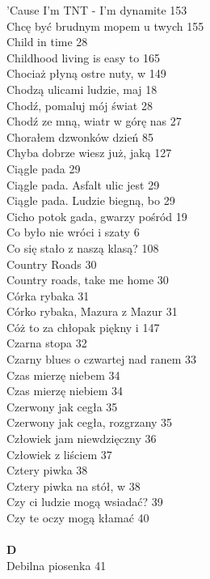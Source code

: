 \documentclass[a5paper, 10pt]{book}
\begin{document}
{\begin{multicols}{3}
    'Cause I'm TNT - I'm dynamite 153\\
    Chcę być brudnym mopem u twych 155\\
    Child in time 28\\
    Childhood living is easy to 165\\
    Chociaż płyną ostre nuty, w 149\\
    Chodzą ulicami ludzie, maj 18\\
    Chodź, pomaluj mój świat 28\\
    Chodź ze mną, wiatr w górę nas 27\\
    Chorałem dzwonków dzień 85\\
    Chyba dobrze wiesz już, jaką 127\\
    Ciągle pada 29\\
    Ciągle pada. Asfalt ulic jest 29\\
    Ciągle pada. Ludzie biegną, bo 29\\
    Cicho potok gada, gwarzy pośród 19\\
    Co było nie wróci i szaty 6\\
    Co się stało z naszą klasą? 108\\
    Country Roads 30\\
    Country roads, take me home 30\\
    Córka rybaka 31\\
    Córko rybaka, Mazura z Mazur 31\\
    Cóż to za chłopak piękny i 147\\
    Czarna stopa 32\\
    Czarny blues o czwartej nad ranem 33\\
    Czas mierzę niebem 34\\
    Czas mierzę niebiem 34\\
    Czerwony jak cegła 35\\
    Czerwony jak cegła, rozgrzany 35\\
    Człowiek jam niewdzięczny 36\\
    Człowiek z liściem 37\\
    Cztery piwka 38\\
    Cztery piwka na stół, w 38\\
    Czy ci ludzie mogą wsiadać? 39\\
    Czy te oczy mogą kłamać 40\\
    \\
    {\footnotesize \textbf{D\\} }
    Debilna piosenka 41\\

\end{multicols}}
\end{document}
